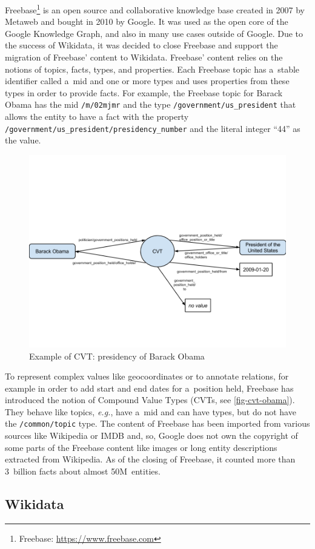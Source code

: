 \documentclass{sig-alternate}
\begin{document}
Freebase\footnote{Freebase: \url{https://www.freebase.com}} is an open source and
collaborative knowledge base created in 2007 by Metaweb and bought in 2010 by Google.
It was used as the open core of the Google Knowledge Graph,
and also in many use cases outside of Google.
Due to the success of Wikidata,
it was decided to close Freebase and support the migration of Freebase' content to Wikidata.
Freebase' content relies on the notions of topics, facts, types, and properties.
Each Freebase topic has a~stable identifier called a~mid and one or more types
and uses properties from these types in order to provide facts.
For example, the Freebase topic for Barack Obama has the mid \texttt{/m/02mjmr}
and the type \texttt{/government/us\_president} that allows the entity to have
a fact with the property \texttt{/government/us\_president/presidency\_number}
and the literal integer ``44'' as the value.

\begin{figure}
\centering
\includegraphics[width=8.45 cm]{img/freebase-cvt-obama.png}
\caption{Example of CVT: presidency of Barack Obama}
\label{fig-cvt-obama}
\end{figure}

To represent complex values like geocoordinates or to annotate relations,
for example in order to add start and end dates for a~position held,
Freebase has introduced the notion of Compound Value Types (CVTs, see \autoref{fig-cvt-obama}).
They behave like topics, \emph{e.g.}, have a~mid and can have types,
but do not have the \texttt{/common/topic} type.
The content of Freebase has been imported from various sources like Wikipedia or IMDB
and, so, Google does not own the copyright of some parts of the Freebase content
like images or long entity descriptions extracted from Wikipedia.
As of the closing of Freebase, it counted more than 3~billion facts
about almost 50M~entities.

\subsection{Wikidata}
\end{document}

